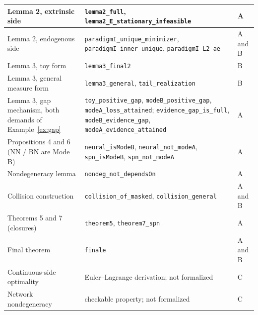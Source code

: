 \begin{table}[htbp]
\begin{tabular}{@{}>{\raggedright\arraybackslash}p{}>{\raggedright\arraybackslash}p{}>{\centering\arraybackslash}p{}@{}}
\hline
Lemma 2, extrinsic side & \texttt{lemma2\_full}, \texttt{lemma2\_E\_stationary\_infeasible} & A\\
\hline
Lemma 2, endogenous side & \texttt{paradigmI\_unique\_minimizer}, \texttt{paradigmI\_inner\_unique}, \texttt{paradigmI\_L2\_ae} & A and B\\
\hline
Lemma 3, toy form & \texttt{lemma3\_final2} & B\\
\hline
Lemma 3, general measure form & \texttt{lemma3\_general}, \texttt{tail\_realization} & B\\
\hline
Lemma 3, gap mechanism, both demands of Example~\ref{ex:gap} & \texttt{toy\_positive\_gap}, \texttt{modeB\_positive\_gap}, \texttt{modeA\_loss\_attained}; \texttt{evidence\_gap\_is\_full}, \texttt{modeB\_evidence\_gap}, \texttt{modeA\_evidence\_attained} & A\\
\hline
Propositions 4 and 6 (NN / BN are Mode B) & \texttt{neural\_isModeB}, \texttt{neural\_not\_modeA}, \texttt{spn\_isModeB}, \texttt{spn\_not\_modeA} & A\\
\hline
Nondegeneracy lemma & \texttt{nondeg\_not\_dependsOn} & A\\
\hline
Collision construction & \texttt{collision\_of\_masked}, \texttt{collision\_general} & A and B\\
\hline
Theorems 5 and 7 (closures) & \texttt{theorem5}, \texttt{theorem7\_spn} & A\\
\hline
Final theorem & \texttt{finale} & A and B\\
\hline
Continuous-side optimality & Euler--Lagrange derivation; not formalized & C\\
\hline
Network nondegeneracy & checkable property; not formalized & C\\
\hline
\end{tabular}
\end{table}


